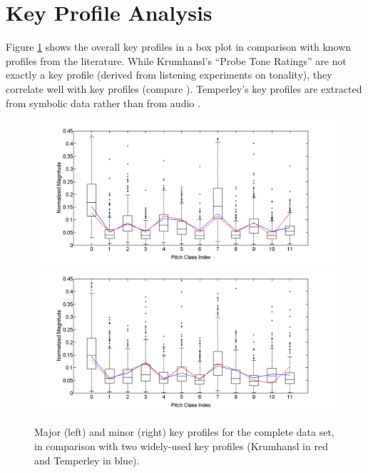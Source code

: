 \documentclass{article}
\begin{document}
\section{Key Profile Analysis}\label{keyprof}
Figure \ref{fig:OverallKeyProfiles} shows the overall key profiles in a box plot in comparison with known profiles from the literature. 
While Krum\-hansl's ``Probe Tone Ratings'' \cite{krumhansl_cognitive_1990} are not exactly a key profile (derived from listening experiments on tonality), they correlate well with key profiles (compare \cite{izmirli_template_2005}). 
Temperley's key profiles are extracted from symbolic data  rather than from audio \cite{temperley_bayesian_2004,temperley_pitch-class_2008}.
\begin{figure}[htb]\setcounter{figure}{2}
\centering
    \includegraphics[scale=.2]{graph/allMajChroma+Krum+Temp}
    \includegraphics[scale=.2]{graph/allMinChroma+Krum+Temp}
	\caption{Major (left) and minor (right) key profiles for the complete data set, in comparison with two widely-used key profiles (Krumhansl in red and Temperley in blue).}
	\label{fig:OverallKeyProfiles}
\end{figure}
\end{document}
